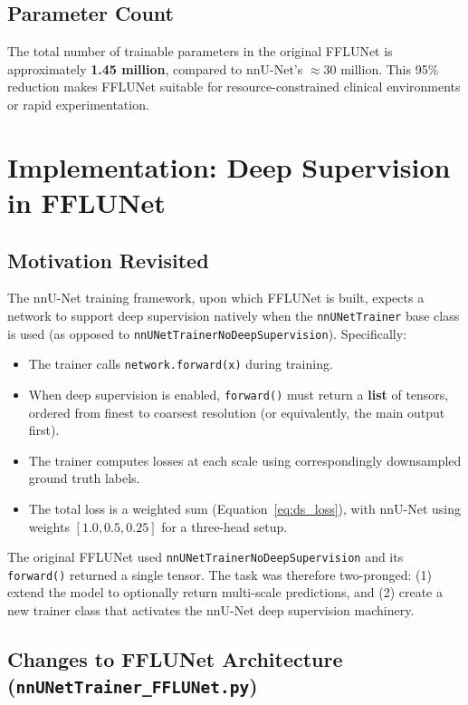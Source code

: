 \documentclass[12pt,a4paper]{report}
\begin{document}
\section{Parameter Count}

The total number of trainable parameters in the original FFLUNet is approximately \textbf{1.45 million}, compared to nnU-Net's $\approx$30 million. This 95\% reduction makes FFLUNet suitable for resource-constrained clinical environments or rapid experimentation.

\chapter{Implementation: Deep Supervision in FFLUNet}

\section{Motivation Revisited}

The nnU-Net training framework, upon which FFLUNet is built, expects a network to support deep supervision natively when the \texttt{nnUNetTrainer} base class is used (as opposed to \texttt{nnUNetTrainerNoDeepSupervision}). Specifically:
\begin{itemize}[leftmargin=*]
    \item The trainer calls \texttt{network.forward(x)} during training.
    \item When deep supervision is enabled, \texttt{forward()} must return a \textbf{list} of tensors, ordered from finest to coarsest resolution (or equivalently, the main output first).
    \item The trainer computes losses at each scale using correspondingly downsampled ground truth labels.
    \item The total loss is a weighted sum (Equation~\ref{eq:ds_loss}), with nnU-Net using weights $[1.0, 0.5, 0.25]$ for a three-head setup.
\end{itemize}

The original FFLUNet used \texttt{nnUNetTrainerNoDeepSupervision} and its \texttt{forward()} returned a single tensor. The task was therefore two-pronged: (1) extend the model to optionally return multi-scale predictions, and (2) create a new trainer class that activates the nnU-Net deep supervision machinery.

\section{Changes to FFLUNet Architecture (\texttt{nnUNetTrainer\_FFLUNet.py})}
\end{document}
